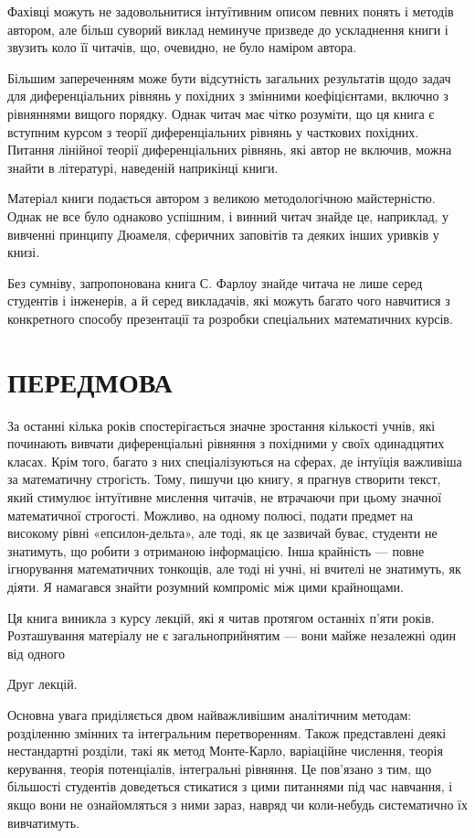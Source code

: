 \documentclass[
  ukrainian,
]{article}
\begin{document}
Фахівці можуть не задовольнитися інтуїтивним описом певних понять і
методів автором, але більш суворий виклад неминуче призведе до
ускладнення книги і звузить коло її читачів, що, очевидно, не було
наміром автора.

Більшим запереченням може бути відсутність загальних результатів щодо
задач для диференціальних рівнянь у похідних з змінними коефіцієнтами,
включно з рівняннями вищого порядку. Однак читач має чітко розуміти, що
ця книга є вступним курсом з теорії диференціальних рівнянь у часткових
похідних. Питання лінійної теорії диференціальних рівнянь, які автор не
включив, можна знайти в літературі, наведеній наприкінці книги.

Матеріал книги подається автором з великою методологічною майстерністю.
Однак не все було однаково успішним, і винний читач знайде це,
наприклад, у вивченні принципу Дюамеля, сферичних заповітів та деяких
інших уривків у книзі.

Без сумніву, запропонована книга С. Фарлоу знайде читача не лише серед
студентів і інженерів, а й серед викладачів, які можуть багато чого
навчитися з конкретного способу презентації та розробки спеціальних
математичних курсів.

\section{ПЕРЕДМОВА}\label{ux43fux435ux440ux435ux434ux43cux43eux432ux430}

За останні кілька років спостерігається значне зростання кількості
учнів, які починають вивчати диференціальні рівняння з похідними у своїх
одинадцятих класах. Крім того, багато з них спеціалізуються на сферах,
де інтуїція важливіша за математичну строгість. Тому, пишучи цю книгу, я
прагнув створити текст, який стимулює інтуїтивне мислення читачів, не
втрачаючи при цьому значної математичної строгості. Можливо, на одному
полюсі, подати предмет на високому рівні «епсилон-дельта», але тоді, як
це зазвичай буває, студенти не знатимуть, що робити з отриманою
інформацією. Інша крайність --- повне ігнорування математичних тонкощів,
але тоді ні учні, ні вчителі не знатимуть, як діяти. Я намагався знайти
розумний компроміс між цими крайнощами.

Ця книга виникла з курсу лекцій, які я читав протягом останніх п'яти
років. Розташування матеріалу не є загальноприйнятим --- вони майже
незалежні один від одного

Друг лекцій.

Основна увага приділяється двом найважливішим аналітичним методам:
розділенню змінних та інтегральним перетворенням. Також представлені
деякі нестандартні розділи, такі як метод Монте-Карло, варіаційне
числення, теорія керування, теорія потенціалів, інтегральні рівняння. Це
пов'язано з тим, що більшості студентів доведеться стикатися з цими
питаннями під час навчання, і якщо вони не ознайомляться з ними зараз,
навряд чи коли-небудь систематично їх вивчатимуть.
\end{document}
